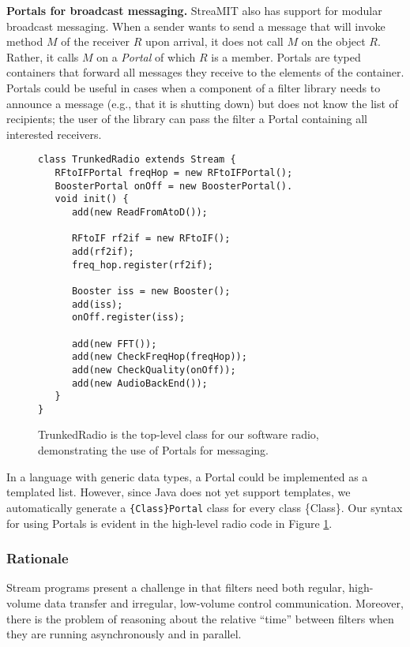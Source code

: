 {\bf Portals for broadcast messaging.}  StreaMIT also has support for
modular broadcast messaging.  When a sender wants to send a message
that will invoke method $M$ of the receiver $R$ upon arrival, it does
not call $M$ on the object $R$.  Rather, it calls $M$ on a {\it
Portal} of which $R$ is a member.  Portals are typed containers that
forward all messages they receive to the elements of the container.
Portals could be useful in cases when a component of a filter library
needs to announce a message (e.g., that it is shutting down) but does
not know the list of recipients; the user of the library can pass the
filter a Portal containing all interested receivers.

\begin{figure}
\scriptsize
\begin{verbatim}
class TrunkedRadio extends Stream {
   RFtoIFPortal freqHop = new RFtoIFPortal();
   BoosterPortal onOff = new BoosterPortal().
   void init() {
      add(new ReadFromAtoD());

      RFtoIF rf2if = new RFtoIF();
      add(rf2if);
      freq_hop.register(rf2if);

      Booster iss = new Booster();
      add(iss);
      onOff.register(iss);
 
      add(new FFT());
      add(new CheckFreqHop(freqHop));
      add(new CheckQuality(onOff));
      add(new AudioBackEnd());
   }
}
\end{verbatim}
\vspace{-12pt}
\caption{\protect\small TrunkedRadio is the top-level class for our
      software radio, demonstrating the use of Portals for messaging.
\protect\label{fig:radiocode}}
\vspace{-12pt}
\end{figure}

In a language with generic data types, a Portal could be implemented
as a templated list.  However, since Java does not yet support
templates, we automatically generate a {\tt \{Class\}Portal} class for
every class \{Class\}.  Our syntax for using Portals is evident in the
high-level radio code in Figure \ref{fig:radiocode}.

\subsubsection{Rationale}

Stream programs present a challenge in that filters need both regular,
high-volume data transfer and irregular, low-volume control
communication.  Moreover, there is the problem of reasoning about the
relative ``time'' between filters when they are running asynchronously
and in parallel.

